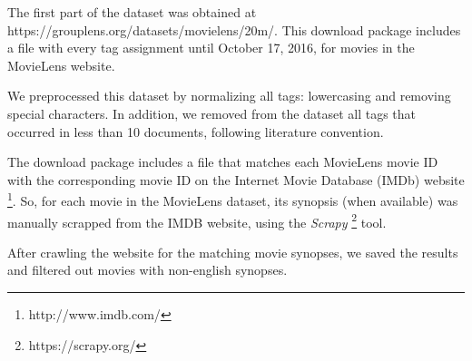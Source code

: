 The first part of the dataset was obtained at https://grouplens.org/datasets/movielens/20m/. This download package includes a file with every tag assignment until October 17, 2016, for movies in the MovieLens website.

We preprocessed this dataset by normalizing all tags: lowercasing and removing special characters. In addition, we removed from the dataset all tags that occurred in less than 10 documents, following literature convention.

The download package includes a file that matches each MovieLens movie ID with the corresponding movie ID on the Internet Movie Database (IMDb) website \footnote{http://www.imdb.com/}. So, for each movie in the MovieLens dataset, its synopsis (when available) was manually scrapped from the IMDB website, using the \textit{Scrapy} \footnote{https://scrapy.org/} tool.

After crawling the website for the matching movie synopses, we saved the results and filtered out movies with non-english synopses.